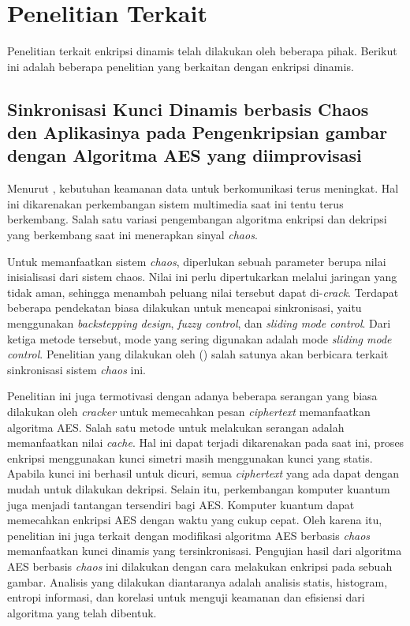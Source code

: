 \section{Penelitian Terkait}

Penelitian terkait enkripsi dinamis telah dilakukan oleh beberapa pihak. Berikut ini adalah beberapa penelitian yang berkaitan dengan enkripsi dinamis. 

\subsection{Sinkronisasi Kunci Dinamis berbasis Chaos den Aplikasinya pada Pengenkripsian gambar dengan Algoritma AES yang diimprovisasi}

Menurut \textcite{lin2021}, kebutuhan keamanan data untuk berkomunikasi terus meningkat. Hal ini dikarenakan perkembangan sistem multimedia saat ini tentu terus berkembang. Salah satu variasi pengembangan algoritma enkripsi dan dekripsi yang berkembang saat ini menerapkan sinyal \emph{chaos}. 

Untuk memanfaatkan sistem \emph{chaos}, diperlukan sebuah parameter berupa nilai inisialisasi dari sistem chaos. Nilai ini perlu dipertukarkan melalui jaringan yang tidak aman, sehingga menambah peluang nilai tersebut dapat di-\emph{crack}. Terdapat beberapa pendekatan biasa dilakukan untuk mencapai sinkronisasi, yaitu menggunakan \emph{backstepping design}, \emph{fuzzy control}, dan \emph{sliding mode control}. Dari ketiga metode tersebut, mode yang sering digunakan adalah mode \emph{sliding mode control}. Penelitian yang dilakukan oleh (\cite{lin2021}) salah satunya akan berbicara terkait sinkronisasi sistem \emph{chaos} ini.

Penelitian ini juga termotivasi dengan adanya beberapa serangan yang biasa dilakukan oleh \emph{cracker} untuk memecahkan pesan \emph{ciphertext} memanfaatkan algoritma AES. Salah satu metode untuk melakukan serangan adalah memanfaatkan nilai \emph{cache}. Hal ini dapat terjadi dikarenakan pada saat ini, proses enkripsi menggunakan kunci simetri masih menggunakan kunci yang statis. Apabila kunci ini berhasil untuk dicuri, semua \emph{ciphertext} yang ada dapat dengan mudah untuk dilakukan dekripsi. Selain itu, perkembangan komputer kuantum juga menjadi tantangan tersendiri bagi AES. Komputer kuantum dapat memecahkan enkripsi AES dengan waktu yang cukup cepat. Oleh karena itu, penelitian ini juga terkait dengan modifikasi algoritma AES berbasis \emph{chaos} memanfaatkan kunci dinamis yang tersinkronisasi. Pengujian hasil dari algoritma AES berbasis \emph{chaos} ini dilakukan dengan cara melakukan enkripsi pada sebuah gambar. Analisis yang dilakukan diantaranya adalah analisis statis, histogram, entropi informasi, dan korelasi untuk menguji keamanan dan efisiensi dari algoritma yang telah dibentuk.

